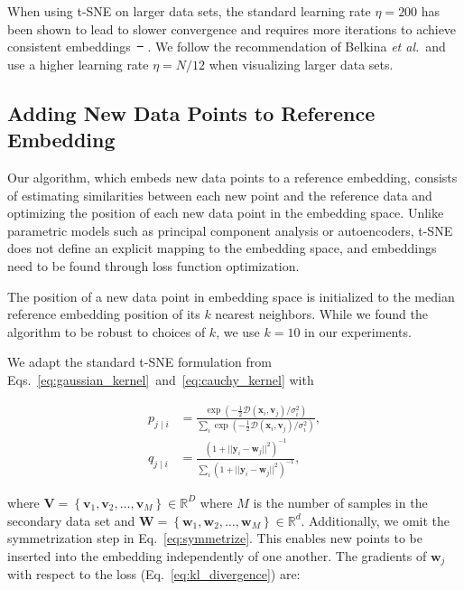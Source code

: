 \documentclass[runningheads]{llncs}
\newcommand{\etal}{\textit{et al.}}
\providecommand{\DIFaddtex}[1]{{\protect\color{blue}\uwave{#1}}} %
\providecommand{\DIFdeltex}[1]{{\protect\color{red}\sout{#1}}}                      %
\providecommand{\DIFaddbegin}{} %
\providecommand{\DIFaddend}{} %
\providecommand{\DIFdelbegin}{} %
\providecommand{\DIFdelend}{} %
\providecommand{\DIFadd}[1]{\texorpdfstring{\DIFaddtex{#1}}{#1}} %
\providecommand{\DIFdel}[1]{\texorpdfstring{\DIFdeltex{#1}}{}} %
\newcommand{\DIFscaledelfig}{0.5}
\newlength{\DIFdelgraphicswidth} %
\newlength{\DIFdelgraphicsheight} %
\newcommand{\DIFaddincludegraphics}[2][]{{\color{blue}\fbox{\DIFOincludegraphics[#1]{#2}}}} %
\newcommand{\DIFdelincludegraphics}[2][]{%
\sbox{\DIFdelgraphicsbox}{\DIFOincludegraphics[#1]{#2}}%
\settoboxwidth{\DIFdelgraphicswidth}{\DIFdelgraphicsbox} %
\settoboxtotalheight{\DIFdelgraphicsheight}{\DIFdelgraphicsbox} %
\scalebox{\DIFscaledelfig}{%
\parbox[b]{\DIFdelgraphicswidth}{\usebox{\DIFdelgraphicsbox}\\[-\baselineskip] \rule{\DIFdelgraphicswidth}{0em}}\llap{\resizebox{\DIFdelgraphicswidth}{\DIFdelgraphicsheight}{%
\setlength{\unitlength}{\DIFdelgraphicswidth}%
\begin{picture}(1,1)%
\thicklines\linethickness{2pt} %
{\color[rgb]{1,0,0}\put(0,0){\framebox(1,1){}}}%
{\color[rgb]{1,0,0}\put(0,0){\line( 1,1){1}}}%
{\color[rgb]{1,0,0}\put(0,1){\line(1,-1){1}}}%
\end{picture}%
}\hspace*{3pt}}} %
} %
\DeclareRobustCommand{\DIFaddbegin}{\DIFOaddbegin \let\includegraphics\DIFaddincludegraphics} %
\DeclareRobustCommand{\DIFaddend}{\DIFOaddend \let\includegraphics\DIFOincludegraphics} %
\DeclareRobustCommand{\DIFdelbegin}{\DIFOdelbegin \let\includegraphics\DIFdelincludegraphics} %
\DeclareRobustCommand{\DIFdelend}{\DIFOaddend \let\includegraphics\DIFOincludegraphics} %
\begin{document}
When using t-SNE on larger data sets, the standard learning rate $\eta = 200$
has been shown to lead to slower convergence and requires more iterations to
achieve consistent embeddings~\DIFdelbegin \DIFdel{\mbox{%
\cite{belkina2019automated}}\hspace{0pt}%
}\DIFdelend \DIFaddbegin \DIFadd{\mbox{%
\cite{Belkina2019}}\hspace{0pt}%
}\DIFaddend . We follow the recommendation
of Belkina \etal ~and use a higher learning rate $\eta = N / 12$ when
visualizing larger data sets.


\subsection{Adding New Data Points to Reference Embedding\label{sec:transfer}}

Our algorithm, which embeds new data points to a reference embedding, consists
of estimating similarities between each new point and the reference data and
optimizing the position of each new data point in the embedding space. Unlike
parametric models such as principal component analysis or autoencoders, t-SNE
does not define an explicit mapping to the embedding space, and embeddings need
to be found through loss function optimization.

The position of a new data point in embedding space is initialized to the median
reference embedding position of its $k$ nearest neighbors. While we found the
algorithm to be robust to choices of $k$, we use $k=10$ in our experiments.

We adapt the standard t-SNE formulation from
Eqs.~\ref{eq:gaussian_kernel}~and~\ref{eq:cauchy_kernel} with

\begin{align}
p_{j \mid i} &= \frac{\exp \left ( -\frac{1}{2} \mathcal{D}(\mathbf{x}_i, \mathbf{v}_j) / \sigma_i^2 \right )}{\sum_{i} \exp \left ( -\frac{1}{2} \mathcal{D}(\mathbf{x}_i, \mathbf{v}_j) / \sigma_i^2 \right )}, \\
q_{j \mid i} &= \frac{\left ( 1 + || \mathbf{y}_i - \mathbf{w}_j ||^2 \right )^{-1}}{\sum_{i}\left ( 1 + || \mathbf{y}_i - \mathbf{w}_j ||^2 \right )^{-1}},
\end{align}

\noindent where $\mathbf{V} = \left \{ \mathbf{v}_1, \mathbf{v}_2, \dots,
\mathbf{v}_M \right \} \in \mathbb{R}^D$ where $M$ is the number of samples in
the secondary data set and $\mathbf{W} = \left \{ \mathbf{w}_1, \mathbf{w}_2, \dots,
\mathbf{w}_M \right \} \in \mathbb{R}^d$. Additionally, we omit the
symmetrization step in Eq.~\ref{eq:symmetrize}. This enables new points to be
inserted into the embedding independently of one another. The gradients of
$\mathbf{w}_j$ with respect to the loss (Eq.~\ref{eq:kl_divergence}) are:
\end{document}
